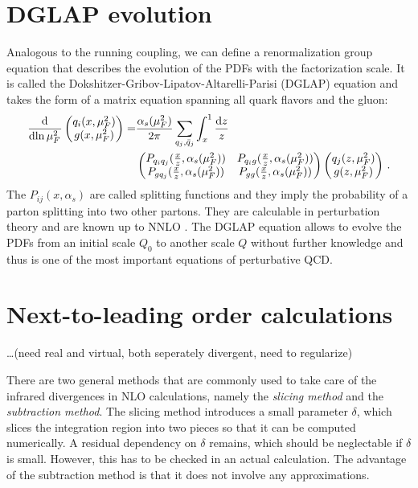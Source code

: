 \section{DGLAP evolution}
Analogous to the running coupling, we can define a renormalization group equation that describes the evolution of the PDFs with the factorization scale.
It is called the Dokshitzer-Gribov-Lipatov-Altarelli-Parisi (DGLAP) equation \cite{dglap1,dglap2,dglap3} and takes the form of a matrix equation spanning all quark flavors and the gluon:
%
\begin{align}
	\dod{}{\ln{\mu_F^2}} \begin{pmatrix} q_i(x,\mu_F^2) \\ g(x,\mu_F^2) \end{pmatrix} = &\frac{\alpha_s(\mu_F^2)}{2 \pi} \sum_{q_j,\bar q_j} \int_x^1 \frac{\dif z}{z} \nonumber \\
	&\begin{pmatrix}
		P_{q_i q_j}(\frac{x}{z},\alpha_s(\mu_F^2))	&	P_{q_i g}(\frac{x}{z},\alpha_s(\mu_F^2)) \\
		P_{g q_j}(\frac{x}{z},\alpha_s(\mu_F^2))	&	P_{gg}(\frac{x}{z},\alpha_s(\mu_F^2))
	\end{pmatrix}
	\begin{pmatrix} q_j(z,\mu_F^2) \\ g(z,\mu_F^2) \end{pmatrix} \, .
	\label{eq:dglap}
\end{align}
%
The $P_{i j}(x,\alpha_s)$ are called splitting functions and they imply the probability of a parton splitting into two other partons.
They are calculable in perturbation theory and are known up to NNLO \cite{splittingkernel1,splittingkernel2}.
The DGLAP equation allows to evolve the PDFs from an initial scale $Q_0$ to another scale $Q$ without further knowledge and thus is one of the most important equations of perturbative QCD.
%
\section{Next-to-leading order calculations}
\label{sec:nlo_calculations}
\ldots(need real and virtual, both seperately divergent, need to regularize)


There are two general methods that are commonly used to take care of the infrared divergences in NLO calculations, namely the \textit{slicing method} and the \textit{subtraction method}.
The slicing method introduces a small parameter $\delta$, which slices the integration region into two pieces so that it can be computed numerically.
A residual dependency on $\delta$ remains, which should be neglectable if $\delta$ is small.
However, this has to be checked in an actual calculation.
The advantage of the subtraction method is that it does not involve any approximations.

